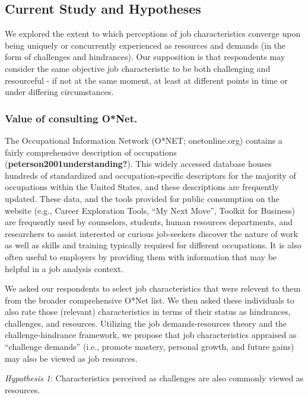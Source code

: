 \documentclass[
  man]{apa6}
\begin{document}
\hypertarget{current-study-and-hypotheses}{%
\subsection{Current Study and Hypotheses}\label{current-study-and-hypotheses}}

We explored the extent to which perceptions of job characteristics converge upon being uniquely or concurrently experienced as resources and demands (in the form of challenges and hindrances). Our supposition is that respondents may consider the same objective job characteristic to be both challenging and resourceful - if not at the same moment, at least at different points in time or under differing circumstances.

\hypertarget{value-of-consulting-onet.}{%
\subsubsection{Value of consulting O*Net.}\label{value-of-consulting-onet.}}

The Occupational Information Network (O*NET; onetonline.org) contains a fairly comprehensive description of occupations (\textbf{peterson2001understanding?}). This widely accessed database houses hundreds of standardized and occupation-specific descriptors for the majority of occupations within the United States, and these descriptions are frequently updated. These data, and the tools provided for public consumption on the website (e.g., Career Exploration Tools, ``My Next Move'', Toolkit for Business) are frequently used by counselors, students, human resources departments, and researchers to assist interested or curious job-seekers discover the nature of work as well as skills and training typically required for different occupations. It is also often useful to employers by providing them with information that may be helpful in a job analysis context.

We asked our respondents to select job characteristics that were relevent to them from the broader comprehensive O*Net list. We then asked these individuals to also rate those (relevant) characteristics in terms of their status as hindrances, challenges, and resources. Utilizing the job demands-resources theory and the challenge-hindrance framework, we propose that job characteristics appraised as ``challenge demands'' (i.e., promote mastery, personal growth, and future gains) may also be viewed as job resources.

\emph{Hypothesis 1}: Characteristics perceived as challenges are also commonly viewed as resources.
\end{document}
